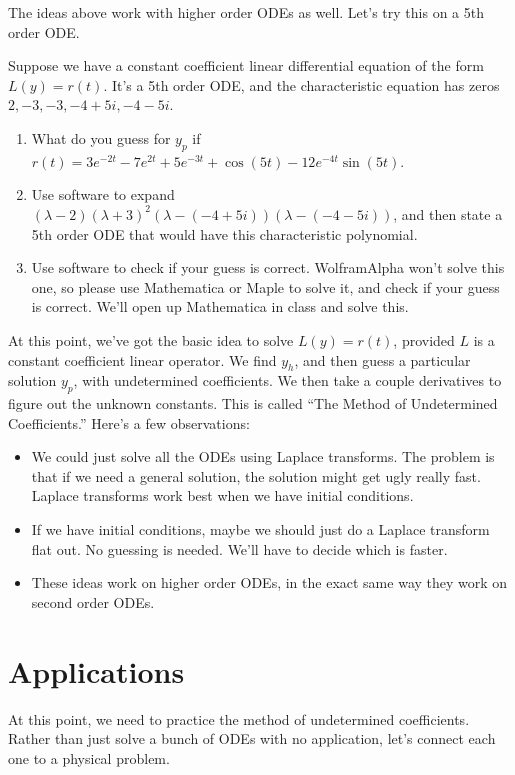 The ideas above work with higher order ODEs as well.  Let's try this on a 5th order ODE.

\begin{problem}
 Suppose we have a constant coefficient linear differential equation of the form $L(y)=r(t)$. It's a 5th order ODE, and the characteristic equation has zeros $2,-3,-3,-4+5i, -4-5i$.  
\begin{enumerate}
 \item What do you guess for $y_p$ if $r(t) = 3e^{-2t}-7e^{2t} +5e^{-3t}+\cos(5t)-12 e^{-4t}\sin(5t)$.  
 \item Use software to expand $(\lambda-2)(\lambda+3)^2(\lambda-(-4+5i))(\lambda-(-4-5i))$, and then state a 5th order ODE that would have this characteristic polynomial.
 \item Use software to check if your guess is correct.  WolframAlpha won't solve this one, so please use Mathematica or Maple to solve it, and check if your guess is correct.  We'll open up Mathematica in class and solve this.  
\end{enumerate}

\end{problem}


At this point, we've got the basic idea to solve $L(y)=r(t)$, provided $L$ is a constant coefficient linear operator. We find $y_h$, and then guess a particular solution $y_p$, with undetermined coefficients.  We then take a couple derivatives to figure out the unknown constants.  This is called ``The Method of Undetermined Coefficients.'' Here's a few observations:
\begin{itemize}
 \item We could just solve all the ODEs using Laplace transforms.  The problem is that if we need a general solution, the solution might get ugly really fast. Laplace transforms work best when we have initial conditions.
 \item If we have initial conditions, maybe we should just do a Laplace transform flat out. No guessing is needed. We'll have to decide which is faster.
 \item These ideas work on higher order ODEs, in the exact same way they work on second order ODEs.  
\end{itemize}

\section{Applications}

At this point, we need to practice the method of undetermined coefficients.  Rather than just solve a bunch of ODEs with no application, let's connect each one to a physical problem.

